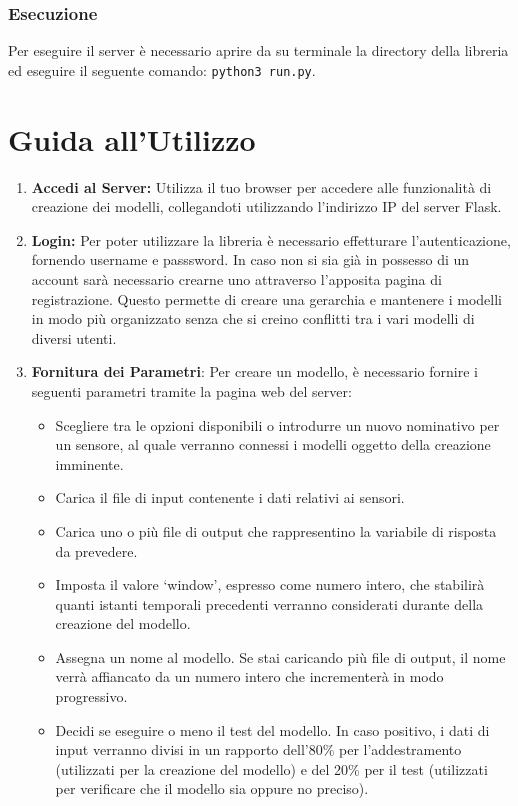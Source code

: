 \documentclass[a4paper,10pt]{article}
\begin{document}
\subsubsection*{Esecuzione}
Per eseguire il server è necessario aprire da su terminale la directory della libreria ed eseguire
il seguente comando: \texttt{python3 run.py}.



\section{Guida all'Utilizzo}
\begin{enumerate}
  \item \textbf{Accedi al Server:} Utilizza il tuo browser per accedere alle funzionalità di creazione dei modelli, 
  collegandoti utilizzando l'indirizzo IP del server Flask.

  \item \textbf{Login:} Per poter utilizzare la libreria è necessario effetturare l'autenticazione, fornendo username e passsword. In caso non si sia già in possesso
  di un account sarà necessario crearne uno attraverso l'apposita pagina di registrazione. Questo permette di creare una gerarchia e mantenere i modelli 
  in modo più organizzato senza che si creino conflitti tra i vari modelli di diversi utenti.

  \item \textbf{Fornitura dei Parametri}: Per creare un modello, è necessario fornire i seguenti parametri tramite la pagina web del server:
  \begin{itemize}
    \item Scegliere tra le opzioni disponibili o introdurre un nuovo nominativo per un sensore, al quale verranno connessi i modelli oggetto della creazione imminente.
    \item Carica il file di input contenente i dati relativi ai sensori.
    \item Carica uno o più file di output che rappresentino la variabile di risposta da prevedere.
    \item Imposta il valore `window', espresso come numero intero, che stabilirà quanti istanti temporali precedenti verranno considerati durante della creazione del modello.
    \item Assegna un nome al modello. Se stai caricando più file di output, il nome verrà affiancato da un numero intero che incrementerà in modo progressivo.
    \item Decidi se eseguire o meno il test del modello. In caso positivo, i dati di input verranno divisi in un rapporto dell'80\% per l'addestramento 
    (utilizzati per la creazione del modello) e del 20\% per il test (utilizzati per verificare che il modello sia oppure no preciso).
  \end{itemize}
  

\end{enumerate}
\end{document}
